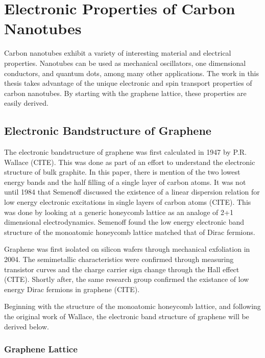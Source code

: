 
\chapter{Electronic Properties of Carbon Nanotubes}
\label{sec:CNT}

Carbon nanotubes exhibit a variety of interesting material and electrical properties. Nanotubes can be used as mechanical oscillators, one dimensional conductors, and quantum dots, among many other applications. The work in this thesis takes advantage of the unique electronic and spin transport properties of carbon nanotubes. By starting with the graphene lattice, these properties are easily derived. 

\section{Electronic Bandstructure of Graphene}

The electronic bandstructure of graphene was first calculated in 1947 by P.R. Wallace (CITE). This was done as part of an effort to understand the electronic structure of bulk graphite. In this paper, there is mention of the two lowest energy bands and the half filling of a single layer of carbon atoms. It was not until 1984 that Semenoff discussed the existence of a linear dispersion relation for low energy electronic excitations in single layers of carbon atoms (CITE). This was done by looking at a generic honeycomb lattice as an analoge of 2+1 dimensional electrodynamics. Semenoff found the low energy electronic band structure of the monoatomic honeycomb lattice matched that of Dirac fermions.

Graphene was first isolated on silicon wafers through mechanical exfoliation in 2004. The semimetallic characteristics were confirmed through measuring transistor curves and the charge carrier sign change through the Hall effect (CITE). Shortly after, the same research group confirmed the existance of low energy Dirac fermions in graphene (CITE).

Beginning with the structure of the monoatomic honeycomb lattice, and following the original work of Wallace, the electronic band structure of graphene will be derived below.

\subsection{Graphene Lattice}


